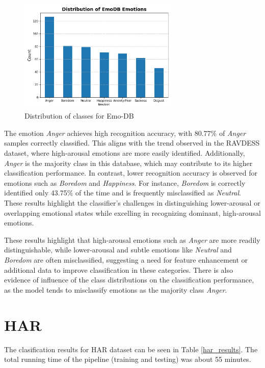 \begin{figure}[H]
  \centering
  \includegraphics[width = 3in, keepaspectratio]{figures/Count plot - EmoDB.png}
  \caption{Distribution of classes for Emo-DB}
  \label{dist_emo}
\end{figure}

The emotion \textit{Anger} achieves high recognition accuracy, with 80.77\% of \textit{Anger} samples correctly classified. This aligns with the trend observed in the RAVDESS dataset, where high-arousal emotions are more easily identified. Additionally, \textit{Anger} is the majority class in this database, which may contribute to its higher classification performance. In contrast, lower recognition accuracy is observed for emotions such as \textit{Boredom} and \textit{Happiness}. For instance, \textit{Boredom} is correctly identified only 43.75\% of the time and is frequently misclassified as \textit{Neutral}. These results highlight the classifier's challenges in distinguishing lower-arousal or overlapping emotional states while excelling in recognizing dominant, high-arousal emotions.

These results highlight that high-arousal emotions such as \textit{Anger} are more readily distinguishable, while lower-arousal and subtle emotions like \textit{Neutral} and \textit{Boredom} are often misclassified, suggesting a need for feature enhancement or additional data to improve classification in these categories. There is also evidence of influence of the class distributions on the classification performance, as the model tends to misclassify emotions as the majority class \textit{Anger}.

\section{HAR}

The clasification results for HAR dataset can be seen in Table \ref{har_results}. The total running time of the pipeline (training and testing) was about 55 minutes.

